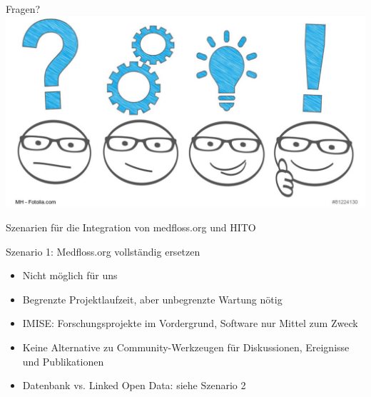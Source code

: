 \documentclass[aspectratio=1610,12pt]{beamer}
\begin{document}

\begin{frame}{Fragen?}
  \centering
  \vspace{-0.5cm}
  \includegraphics[width=\textwidth]{img/fragen.png}
\end{frame}

\begin{frame}
  \centering
  \huge Szenarien für die Integration von medfloss.org und HITO
\end{frame}

\begin{frame}{Szenario 1: Medfloss.org vollständig ersetzen}
\begin{spacing}{1.25}
\begin{itemize}
\item Nicht möglich für uns
\item Begrenzte Projektlaufzeit, aber unbegrenzte Wartung nötig
\item IMISE: Forschungsprojekte im Vordergrund, Software nur Mittel zum Zweck
\item Keine Alternative zu Community-Werkzeugen für Diskussionen, Ereignisse und Publikationen
\item Datenbank vs. Linked Open Data: siehe Szenario 2
\end{itemize}
\end{spacing}
\end{frame}
\end{document}
